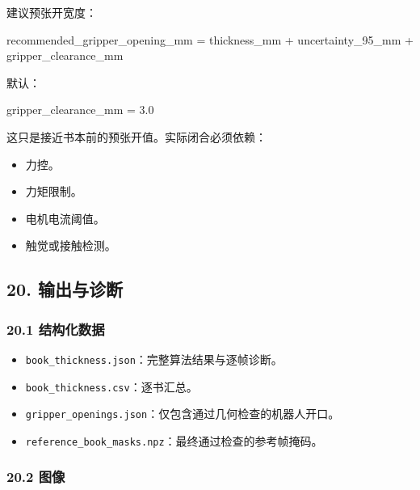 \documentclass[
  chinese,
  11pt,
  a4paper,
]{article}
\newenvironment{Shaded}{\begin{snugshade}}{\end{snugshade}}
\newcommand{\NormalTok}[1]{#1}
\providecommand{\tightlist}{%
  \setlength{\itemsep}{0pt}\setlength{\parskip}{0pt}}
\begin{document}
建议预张开宽度：

\begin{Shaded}
\begin{Highlighting}[]
\NormalTok{recommended\_gripper\_opening\_mm}
\NormalTok{= thickness\_mm}
\NormalTok{ + uncertainty\_95\_mm}
\NormalTok{ + gripper\_clearance\_mm}
\end{Highlighting}
\end{Shaded}

默认：

\begin{Shaded}
\begin{Highlighting}[]
\NormalTok{gripper\_clearance\_mm = 3.0}
\end{Highlighting}
\end{Shaded}

这只是接近书本前的预张开值。实际闭合必须依赖：

\begin{itemize}
\tightlist
\item
  力控。
\item
  力矩限制。
\item
  电机电流阈值。
\item
  触觉或接触检测。
\end{itemize}

\subsection{20. 输出与诊断}\label{20-ux8f93ux51faux4e0eux8bcaux65ad}

\subsubsection{20.1
结构化数据}\label{201-ux7ed3ux6784ux5316ux6570ux636e}

\begin{itemize}
\tightlist
\item
  \texttt{book\_thickness.json}：完整算法结果与逐帧诊断。
\item
  \texttt{book\_thickness.csv}：逐书汇总。
\item
  \texttt{gripper\_openings.json}：仅包含通过几何检查的机器人开口。
\item
  \texttt{reference\_book\_masks.npz}：最终通过检查的参考帧掩码。
\end{itemize}

\subsubsection{20.2 图像}\label{202-ux56feux50cf}
\end{document}
